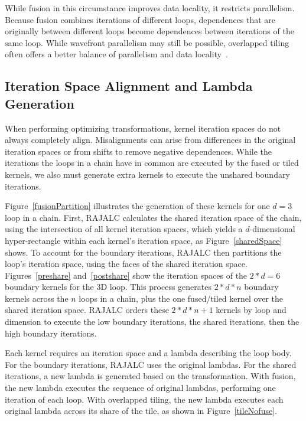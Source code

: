 While fusion in this circumstance improves data locality, it restricts
parallelism.
Because fusion combines iterations of different loops, dependences that
are originally between different loops become dependences between iterations
of the same loop. 
While wavefront parallelism may still be possible, overlapped tiling often
offers a better balance of parallelism and data locality~\cite{CathieSC14}.

\subsection{Iteration Space Alignment and Lambda Generation}
When performing optimizing transformations, kernel iteration spaces do not
always completely align. 
Misalignments can arise from differences in the original iteration spaces
or from shifts to remove negative dependences. 
While the iterations the loops in a chain have in common are executed by
the fused or tiled kernels, we also must generate extra kernels to execute
the unshared boundary iterations.

Figure~\ref{fusionPartition} illustrates the generation of these kernels
for one $d=3$ loop in a chain. 
First, RAJALC calculates the shared iteration space of the chain, using the
intersection of all kernel iteration spaces, which yields a $d$-dimensional
hyper-rectangle within each kernel's iteration space, as
Figure~\ref{sharedSpace} shows.
To account for the boundary iterations, RAJALC then partitions the loop's
iteration space, using the faces of the shared iteration space.
Figures~\ref{preshare} and~\ref{postshare} show the iteration spaces of the
$2*d=6$ boundary kernels for the 3D loop. 
This process generates $2*d*n$ boundary kernels across the $n$ loops in a
chain, plus the one fused/tiled kernel over the shared iteration space. 
RAJALC orders these $2*d*n+1$ kernels by loop and dimension to execute the low
boundary iterations, the shared iterations, then the high boundary iterations.

Each kernel requires an iteration space and a lambda describing the loop body. 
For the boundary iterations, RAJALC uses the original lambdas. 
For the shared iterations, a new lambda is generated based on the transformation. 
With fusion, the new lambda executes the sequence of original lambdas, performing one iteration of each loop.
With overlapped tiling, the new lambda executes each original lambda across its share of the tile, as shown in Figure~\ref{tileNofuse}.


